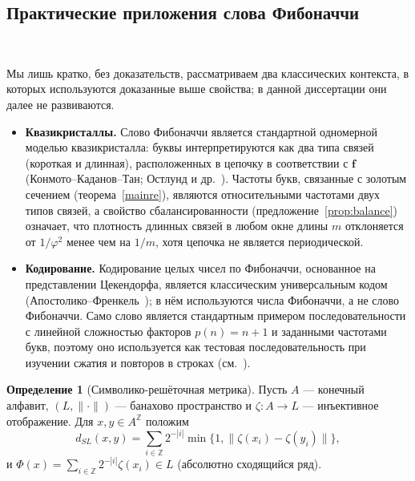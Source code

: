 \documentclass[a4paper,14pt]{extreport}
\theoremstyle{plain}
\theoremstyle{definition}
\newtheorem{definition}{Определение}[section]
\theoremstyle{remark}
\begin{document}
\subsection{Практические приложения слова Фибоначчи}~\label{sec3.7.2}

Мы лишь кратко, без доказательств, рассматриваем два классических контекста, в которых используются доказанные выше свойства; в данной диссертации они далее не развиваются.

\begin{itemize}
	\item \textbf{Квазикристаллы.} Слово Фибоначчи является стандартной одномерной моделью квазикристалла: буквы интерпретируются как два типа связей (короткая и длинная), расположенных в цепочку в соответствии с $\mathbf f$ (Конмото--Каданов--Тан; Остлунд и др.~\cite{KKT,Ostlund}). Частоты букв, связанные с золотым сечением (теорема~\ref{mainre}), являются относительными частотами двух типов связей, а свойство сбалансированности (предложение~\ref{prop:balance}) означает, что плотность длинных связей в любом окне длины $m$ отклоняется от $1/\varphi^{2}$ менее чем на $1/m$, хотя цепочка не является периодической.
	
	\item \textbf{Кодирование.} Кодирование целых чисел по Фибоначчи, основанное на представлении Цекендорфа, является классическим универсальным кодом (Апостолико--Френкель~\cite{ApostolicoFraenkel}); в нём используются числа Фибоначчи, а не слово Фибоначчи. Само слово является стандартным примером последовательности с линейной сложностью факторов $p(n)=n+1$ и заданными частотами букв, поэтому оно используется как тестовая последовательность при изучении сжатия и повторов в строках (см.~\cite{Crochemore}).
\end{itemize}
\begin{definition}[Символико-решёточная метрика]\label{sec:dSL}
	Пусть $A$ --- конечный алфавит, $(L,\|\cdot\|)$ --- банахово пространство и $\zeta:A\to L$ --- инъективное отображение.
	Для $x,y\in A^{\mathbb Z}$ положим \begin{equation}\label{SymboliclatticeMetri} d_{SL}(x,y)=\sum_{i\in\mathbb Z}2^{-|i|}\min\{1,\|\zeta(x_i)-\zeta(y_i)\|\}, \end{equation} и $\Phi(x)=\sum_{i\in\mathbb Z}2^{-|i|}\zeta(x_i)\in L$ (абсолютно сходящийся ряд).
\end{definition}
\end{document}
